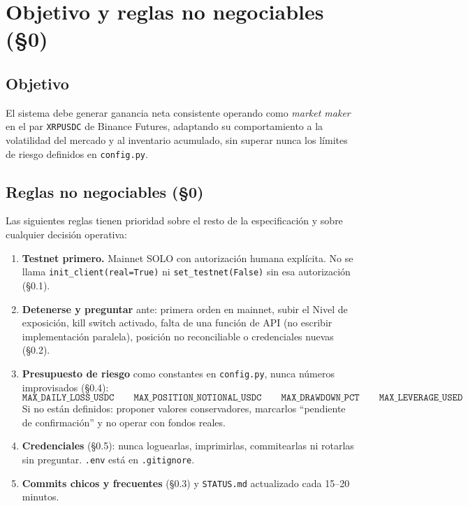 \documentclass[11pt,a4paper]{article}
\newcommand{\codigo}[1]{\texttt{#1}}
\begin{document}
\tableofcontents
\newpage

\section{Objetivo y reglas no negociables (§0)}

\subsection{Objetivo}
El sistema debe generar ganancia neta consistente operando como
\emph{market maker} en el par \codigo{XRPUSDC} de Binance Futures,
adaptando su comportamiento a la volatilidad del mercado y al inventario
acumulado, sin superar nunca los límites de riesgo definidos en
\codigo{config.py}.

\subsection{Reglas no negociables (§0)}
Las siguientes reglas tienen prioridad sobre el resto de la
especificación y sobre cualquier decisión operativa:

\begin{enumerate}
  \item \textbf{Testnet primero.} Mainnet SOLO con autorización humana
  explícita. No se llama \codigo{init\_client(real=True)} ni
  \codigo{set\_testnet(False)} sin esa autorización (§0.1).
  \item \textbf{Detenerse y preguntar} ante: primera orden en mainnet,
  subir el Nivel de exposición, kill switch activado, falta de una
  función de API (no escribir implementación paralela), posición no
  reconciliable o credenciales nuevas (§0.2).
  \item \textbf{Presupuesto de riesgo} como constantes en
  \codigo{config.py}, nunca números improvisados (§0.4):
  \begin{equation*}
    \codigo{MAX\_DAILY\_LOSS\_USDC} \qquad
    \codigo{MAX\_POSITION\_NOTIONAL\_USDC} \qquad
    \codigo{MAX\_DRAWDOWN\_PCT} \qquad
    \codigo{MAX\_LEVERAGE\_USED}
  \end{equation*}
  Si no están definidos: proponer valores conservadores, marcarlos
  ``pendiente de confirmación'' y no operar con fondos reales.
  \item \textbf{Credenciales} (§0.5): nunca loguearlas, imprimirlas,
  commitearlas ni rotarlas sin preguntar. \codigo{.env} está en
  \codigo{.gitignore}.
  \item \textbf{Commits chicos y frecuentes} (§0.3) y \codigo{STATUS.md}
  actualizado cada 15--20 minutos.
\end{enumerate}
\end{document}
